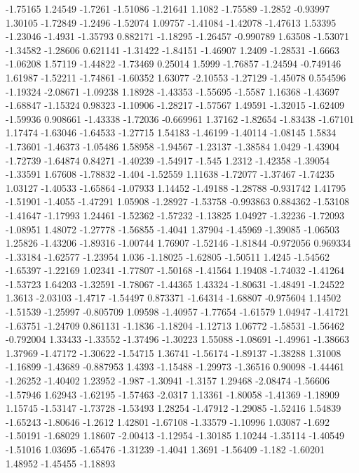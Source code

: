 \documentclass[9pt]{article}
\theoremstyle{plain}
\theoremstyle{definition}
\theoremstyle{remark}
\numberwithin{equation}{section}
\begin{document}
-1.75165
1.24549
-1.7261
-1.51086
-1.21641
1.1082
-1.75589
-1.2852
-0.93997
1.30105
-1.72849
-1.2496
-1.52074
1.09757
-1.41084
-1.42078
-1.47613
1.53395
-1.23046
-1.4931
-1.35793
0.882171
-1.18295
-1.26457
-0.990789
1.63508
-1.53071
-1.34582
-1.28606
0.621141
-1.31422
-1.84151
-1.46907
1.2409
-1.28531
-1.6663
-1.06208
1.57119
-1.44822
-1.73469
0.25014
1.5999
-1.76857
-1.24594
-0.749146
1.61987
-1.52211
-1.74861
-1.60352
1.63077
-2.10553
-1.27129
-1.45078
0.554596
-1.19324
-2.08671
-1.09238
1.18928
-1.43353
-1.55695
-1.5587
1.16368
-1.43697
-1.68847
-1.15324
0.98323
-1.10906
-1.28217
-1.57567
1.49591
-1.32015
-1.62409
-1.59936
0.908661
-1.43338
-1.72036
-0.669961
1.37162
-1.82654
-1.83438
-1.67101
1.17474
-1.63046
-1.64533
-1.27715
1.54183
-1.46199
-1.40114
-1.08145
1.5834
-1.73601
-1.46373
-1.05486
1.58958
-1.94567
-1.23137
-1.38584
1.0429
-1.43904
-1.72739
-1.64874
0.84271
-1.40239
-1.54917
-1.545
1.2312
-1.42358
-1.39054
-1.33591
1.67608
-1.78832
-1.404
-1.52559
1.11638
-1.72077
-1.37467
-1.74235
1.03127
-1.40533
-1.65864
-1.07933
1.14452
-1.49188
-1.28788
-0.931742
1.41795
-1.51901
-1.4055
-1.47291
1.05908
-1.28927
-1.53758
-0.993863
0.884362
-1.53108
-1.41647
-1.17993
1.24461
-1.52362
-1.57232
-1.13825
1.04927
-1.32236
-1.72093
-1.08951
1.48072
-1.27778
-1.56855
-1.4041
1.37904
-1.45969
-1.39085
-1.06503
1.25826
-1.43206
-1.89316
-1.00744
1.76907
-1.52146
-1.81844
-0.972056
0.969334
-1.33184
-1.62577
-1.23954
1.036
-1.18025
-1.62805
-1.50511
1.4245
-1.54562
-1.65397
-1.22169
1.02341
-1.77807
-1.50168
-1.41564
1.19408
-1.74032
-1.41264
-1.53723
1.64203
-1.32591
-1.78067
-1.44365
1.43324
-1.80631
-1.48491
-1.24522
1.3613
-2.03103
-1.4717
-1.54497
0.873371
-1.64314
-1.68807
-0.975604
1.14502
-1.51539
-1.25997
-0.805709
1.09598
-1.40957
-1.77654
-1.61579
1.04947
-1.41721
-1.63751
-1.24709
0.861131
-1.1836
-1.18204
-1.12713
1.06772
-1.58531
-1.56462
-0.792004
1.33433
-1.33552
-1.37496
-1.30223
1.55088
-1.08691
-1.49961
-1.38663
1.37969
-1.47172
-1.30622
-1.54715
1.36741
-1.56174
-1.89137
-1.38288
1.31008
-1.16899
-1.43689
-0.887953
1.4393
-1.15488
-1.29973
-1.36516
0.90098
-1.44461
-1.26252
-1.40402
1.23952
-1.987
-1.30941
-1.3157
1.29468
-2.08474
-1.56606
-1.57946
1.62943
-1.62195
-1.57463
-2.0317
1.13361
-1.80058
-1.41369
-1.18909
1.15745
-1.53147
-1.73728
-1.53493
1.28254
-1.47912
-1.29085
-1.52416
1.54839
-1.65243
-1.80646
-1.2612
1.42801
-1.67108
-1.33579
-1.10996
1.03087
-1.692
-1.50191
-1.68029
1.18607
-2.00413
-1.12954
-1.30185
1.10244
-1.35114
-1.40549
-1.51016
1.03695
-1.65476
-1.31239
-1.4041
1.3691
-1.56409
-1.182
-1.60201
1.48952
-1.45455
-1.18893
\end{document}
